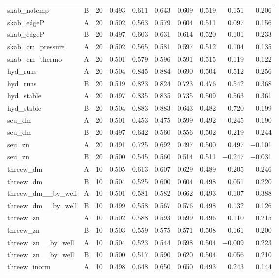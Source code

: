 \begin{tabular}{@{}l c r rrrrrrr@{}}
skab\_notemp & B & 20 & 0.493 & 0.611 & 0.643 & 0.609 & 0.519 & 0.151 & 0.206 \\
skab\_edgeP & A & 20 & 0.502 & 0.563 & 0.579 & 0.604 & 0.511 & 0.097 & 0.156 \\
skab\_edgeP & B & 20 & 0.497 & 0.603 & 0.631 & 0.614 & 0.520 & 0.101 & 0.233 \\
skab\_cm\_pressure & A & 20 & 0.502 & 0.565 & 0.581 & 0.597 & 0.512 & 0.104 & 0.135 \\
skab\_cm\_thermo & A & 20 & 0.501 & 0.579 & 0.596 & 0.591 & 0.515 & 0.119 & 0.122 \\
hyd\_runs & A & 20 & 0.504 & 0.845 & 0.884 & 0.690 & 0.504 & 0.512 & 0.256 \\
hyd\_runs & B & 20 & 0.519 & 0.823 & 0.824 & 0.723 & 0.476 & 0.542 & 0.368 \\
hyd\_stable & A & 20 & 0.497 & 0.835 & 0.835 & 0.735 & 0.509 & 0.563 & 0.361 \\
hyd\_stable & B & 20 & 0.504 & 0.883 & 0.883 & 0.643 & 0.482 & 0.720 & 0.199 \\
seu\_dm & A & 20 & 0.501 & 0.453 & 0.475 & 0.599 & 0.492 & $-$0.245 & 0.190 \\
seu\_dm & B & 20 & 0.497 & 0.642 & 0.560 & 0.556 & 0.502 & 0.219 & 0.244 \\
seu\_zn & A & 20 & 0.491 & 0.725 & 0.692 & 0.497 & 0.500 & 0.497 & $-$0.101 \\
seu\_zn & B & 20 & 0.500 & 0.545 & 0.560 & 0.514 & 0.511 & $-$0.247 & $-$0.031 \\
threew\_dm & A & 10 & 0.505 & 0.613 & 0.607 & 0.629 & 0.489 & 0.205 & 0.246 \\
threew\_dm & B & 10 & 0.504 & 0.525 & 0.600 & 0.604 & 0.498 & 0.051 & 0.220 \\
threew\_dm\_\_by\_well & A & 10 & 0.501 & 0.581 & 0.582 & 0.662 & 0.493 & 0.107 & 0.388 \\
threew\_dm\_\_by\_well & B & 10 & 0.499 & 0.558 & 0.567 & 0.576 & 0.498 & 0.132 & 0.126 \\
threew\_zn & A & 10 & 0.502 & 0.588 & 0.593 & 0.599 & 0.496 & 0.110 & 0.215 \\
threew\_zn & B & 10 & 0.503 & 0.559 & 0.575 & 0.571 & 0.508 & 0.161 & 0.200 \\
threew\_zn\_\_by\_well & A & 10 & 0.504 & 0.523 & 0.544 & 0.598 & 0.504 & $-$0.009 & 0.223 \\
threew\_zn\_\_by\_well & B & 10 & 0.500 & 0.517 & 0.590 & 0.620 & 0.504 & 0.056 & 0.210 \\
threew\_inorm & A & 10 & 0.498 & 0.648 & 0.650 & 0.650 & 0.493 & 0.243 & 0.144 \\

\end{tabular}
